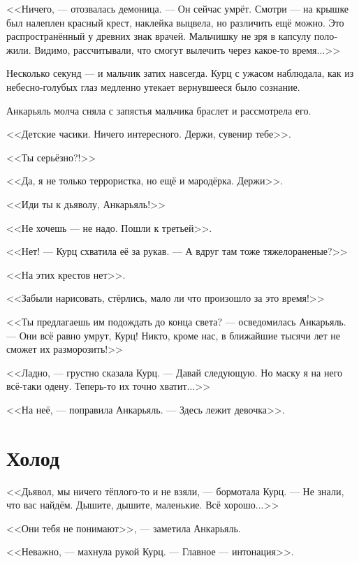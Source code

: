 \documentclass[a4paper,12pt,fleqn]{book}\usepackage{polyglossia}\setdefaultlanguage[babelshorthands=true]{russian}\setotherlanguage{english}\defaultfontfeatures{Ligatures=TeX,Mapping=tex-text}\usepackage{xcolor}\newcommand{\ml}[3]{#2}
\begin{document}
<<Ничего, --- отозвалась демоница.
--- Он сейчас умрёт.
Смотри --- на крышке был налеплен красный крест, наклейка выцвела, но различить ещё можно.
Это распространённый у древних знак врачей.
Мальчишку не зря в капсулу положили.
Видимо, рассчитывали, что смогут вылечить через какое-то время...>>

Несколько секунд --- и мальчик затих навсегда.
Курц с ужасом наблюдала, как из небесно-голубых глаз медленно утекает вернувшееся было сознание.

Анкарьяль молча сняла с запястья мальчика браслет и рассмотрела его.

\ml{$0$}
{<<Детские часики.}
{``A children watch.}
\ml{$0$}
{Ничего интересного.}
{Zero percent interest.}
Держи, сувенир тебе>>.

\ml{$0$}
{<<Ты серьёзно?!>>}
{``Seriously!''}

\ml{$0$}
{<<Да, я не только террористка, но ещё и мародёрка.}
{``Yes, I'm not only a terrorist, but a marauder too.}
Держи>>.

\ml{$0$}
{<<Иди ты к дьяволу, Анкарьяль!>>}
{``Fuck yourself, Angaralle!''}

\ml{$0$}
{<<Не хочешь --- не надо.}
{``Take it, or leave it.}
Пошли к третьей>>.

<<Нет! --- Курц схватила её за рукав.
--- А вдруг там тоже тяжелораненые?>>

<<На этих крестов нет>>.

<<Забыли нарисовать, стёрлись, мало ли что произошло за это время!>>

<<Ты предлагаешь им подождать до конца света? --- осведомилась Анкарьяль.
--- Они всё равно умрут, Курц!
Никто, кроме нас, в ближайшие тысячи лет не сможет их разморозить!>>

<<Ладно, --- грустно сказала Курц.
--- Давай следующую.
Но маску я на него всё-таки одену.
Теперь-то их точно хватит...>>

<<На неё, --- поправила Анкарьяль.
--- Здесь лежит девочка>>.

\section{Холод}

<<Дьявол, мы ничего тёплого-то и не взяли, --- бормотала Курц.
--- Не знали, что вас найдём.
Дышите, дышите, маленькие.
Всё хорошо...>>

<<Они тебя не понимают>>, --- заметила Анкарьяль.

<<Неважно, --- махнула рукой Курц.
--- Главное --- интонация>>.
\end{document}
